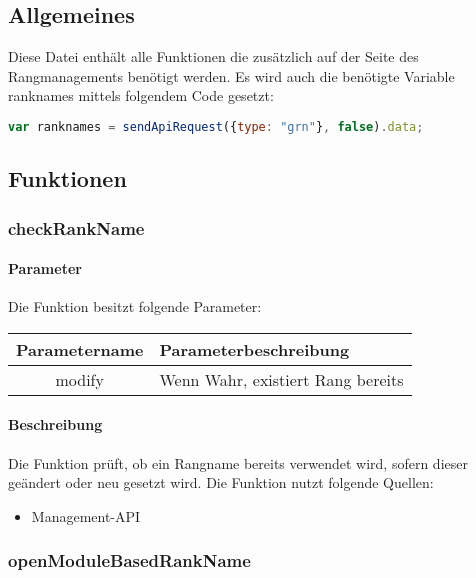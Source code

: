 \subsection{Allgemeines} Diese Datei enthält alle Funktionen die zusätzlich auf der Seite des Rangmanagements benötigt werden.
Es wird auch die benötigte Variable {\glqq ranknames\grqq} mittels folgendem Code gesetzt:
\begin{lstlisting}[language=JavaScript]
var ranknames = sendApiRequest({type: "grn"}, false).data;
\end{lstlisting}
\subsection{Funktionen}
\subsubsection{checkRankName}
\paragraph{Parameter} Die Funktion besitzt folgende Parameter:
\begin{table}[H]
	\begin{tabular}{|c|p{11cm}|}
		\hline
		\textbf{Parametername} & \textbf{Parameterbeschreibung} \\ \hline
		modify & Wenn Wahr, existiert Rang bereits \\ \hline
	\end{tabular}
\end{table}
\paragraph{Beschreibung} Die Funktion prüft, ob ein Rangname bereits verwendet wird, sofern dieser geändert oder neu gesetzt wird. Die Funktion nutzt folgende Quellen:
\begin{itemize}
	\item Management-API
\end{itemize}
\subsubsection{openModuleBasedRankName}
